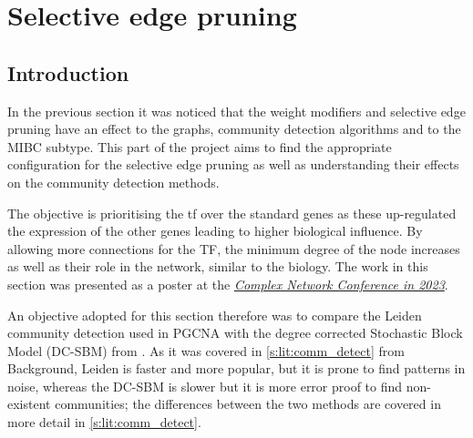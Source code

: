 \chapter{Selective edge pruning} \label{s:N_I:sel_pruning}
\vspace{3mm}
\vspace{3mm}

\section{Introduction}

In the previous section it was noticed that the weight modifiers and selective edge pruning have an effect to the graphs, community detection algorithms and to the MIBC subtype. This part of the project aims to find the appropriate configuration for the selective edge pruning as well as understanding their effects on the community detection methods. 

The objective is prioritising the \acrfull{tf} over the standard genes as these up-regulated the expression of the other genes leading to higher biological influence. By allowing more connections for the TF, the minimum degree of the node increases as well as their role in the network, similar to the biology. The work in this section was presented as a poster at the \textit{\href{https://2023.complexnetworks.org/}{Complex Network Conference in 2023}}.

An objective adopted for this section therefore was to compare the Leiden \citep{Traag2019-ne} community detection used in PGCNA with the degree corrected Stochastic Block Model (DC-SBM) from \citet{Karrer2011-si, Peixoto2017-gc}. As it was covered in \cref{s:lit:comm_detect} from Background, Leiden is faster and more popular, but it is prone to find patterns in noise, whereas the DC-SBM is slower but it is more error proof to find non-existent communities; the differences between the two methods are covered in more detail in \cref{s:lit:comm_detect}. 

